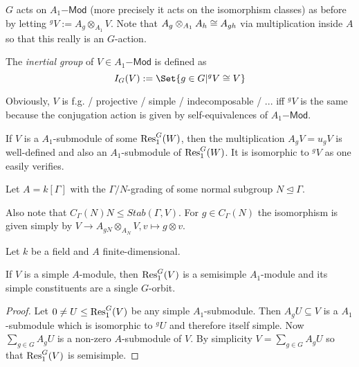 
\begin{definition}
$G$ acts on $A_1\mathsf{-Mod}$ (more precisely it acts on the isomorphism classes) as before by letting ${^g V}:=A_g\otimes_{A_1} V$. Note that $A_g \otimes_{A_1} A_h \cong A_{gh}$ via multiplication inside $A$ so that this really is an $G$-action.

The \emph{inertial group} of $V\in A_1\mathsf{-Mod}$ is defined as
\[I_G(V):=\Set{g\in G | {^g V}\isomorphic V}\]
\end{definition}

\begin{remark}
Obviously, $V$ is f.g. / projective / simple / indecomposable / ... iff ${^g V}$ is the same because the conjugation action is given by self-equivalences of $A_1\mathsf{-Mod}$.
\end{remark}

\begin{remark}
If $V$ is a $A_1$-submodule of some $\operatorname{Res}_1^G(W)$, then the multiplication $A_g V=u_g V$ is well-defined and also an $A_1$-submodule of $\operatorname{Res}_1^G(W)$. It is isomorphic to ${^gV}$ as one easily verifies.
\end{remark}

\begin{example}
Let $A=k[\Gamma]$ with the $\Gamma/N$-grading of some normal subgroup $N\unlhd\Gamma$.

Also note that $C_\Gamma(N)N\leq Stab(\Gamma,V)$. For $g\in C_\Gamma(N)$ the isomorphism is given simply by $V\to A_{gN}\otimes_{A_N} V, v\mapsto g\otimes v$.
\end{example}

\begin{lemma}\label{clifford_theory:semisimple_restriction}
Let $k$ be a field and $A$ finite-dimensional.

If $V$ is a simple $A$-module, then $\operatorname{Res}_1^G(V)$ is a semisimple $A_1$-module and its simple constituents are a single $G$-orbit.
\end{lemma}
\begin{proof}
Let $0\neq U\leq\operatorname{Res}_1^G(V)$ be any simple $A_1$-submodule. Then $A_g U\subseteq V$ is a $A_1$-submodule which is isomorphic to $^gU$ and therefore itself simple. Now $\sum_{g\in G} A_g U$ is a non-zero $A$-submodule of $V$. By simplicity $V=\sum_{g\in G} A_g U$ so that $\operatorname{Res}_1^G(V)$ is semisimple.
\end{proof}

